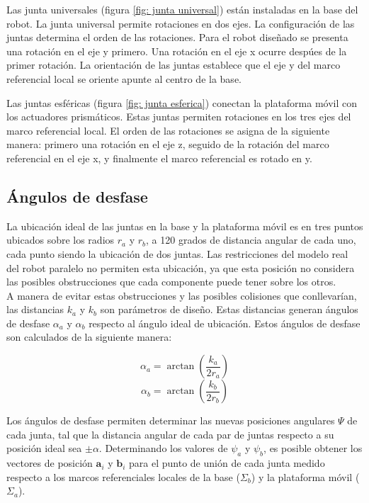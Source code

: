 Las junta universales (figura \ref{fig: junta universal}) están
instaladas en la base del robot. 
La junta universal permite rotaciones en dos ejes.
La configuración de las juntas determina el orden de las rotaciones.
Para el robot diseñado se presenta una rotación en el eje y primero.
Una rotación en el eje x ocurre despúes de la primer rotación.
La orientación de las juntas establece que el eje y 
del marco referencial local se oriente apunte al centro de la base.

Las juntas esféricas (figura \ref{fig: junta esferica}) conectan la 
plataforma móvil con los actuadores prismáticos.
Estas juntas permiten rotaciones en los tres ejes del marco referencial
local.
El orden de las rotaciones se asigna de la siguiente manera:
primero una rotación en el eje z, seguido de la rotación del 
marco referencial en el eje x, y finalmente el marco 
referencial es rotado en y.

\subsection{Ángulos de desfase}

La ubicación ideal de las juntas en la base y la plataforma móvil 
es en tres puntos ubicados sobre los radios $r_a$ y $r_b$, 
a 120 grados de distancia angular de cada uno, 
cada punto siendo la ubicación de dos juntas.
Las restricciones del modelo real del robot paralelo no permiten esta
ubicación, ya que esta posición no considera las posibles obstrucciones
que cada componente puede tener sobre los otros.\\

A manera de evitar estas obstrucciones y las posibles 
colisiones que conllevarían, 
las distancias $k_a$ y $k_b$ son parámetros de diseño.
Estas distancias generan ángulos de desfase 
$\alpha_a$ y $\alpha_b$ respecto al ángulo ideal de ubicación.
Estos ángulos de desfase son calculados de la siguiente manera:

\begin{equation} \label{eq: azi-a}
\alpha_a = \arctan\left(\frac{k_a}{2r_a}\right)
\end{equation}
\begin{equation} \label{eq: azi-b}
\alpha_b = \arctan\left(\frac{k_b}{2r_b}\right)
\end{equation}

Los ángulos de desfase permiten determinar las nuevas posiciones angulares 
$\Psi$ de cada junta, tal que la distancia angular de cada par de juntas 
respecto a su posición ideal sea $\pm \alpha$. 
Determinando los valores de $\psi_a$ y $\psi_b$, es posible
obtener los vectores de posición $\mathbf a_i$ y $\mathbf b_i$ 
para el punto de unión de cada junta
medido respecto a los marcos referenciales locales de 
la base ($\Sigma_b$) y la plataforma móvil ($\Sigma_a$).


